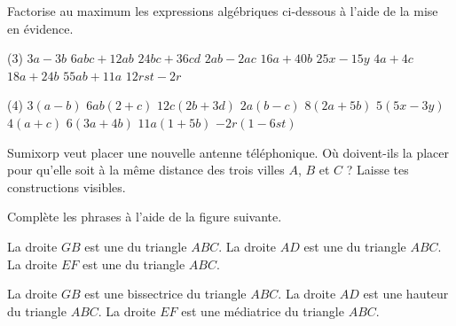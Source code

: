 \documentclass[a4paper,fontsize=12pt, parskip=half]{scrartcl}
\begin{document}
\begin{exercise}
    Factorise au maximum les expressions algébriques ci-dessous à l'aide
    de la mise en évidence.
    \begin{tasks}(3)
        \task $3a-3b$
        \task $6abc+12ab$
        \task $24bc+36cd$
        \task $2ab-2ac$
        \task $16a+40b$
        \task $25x-15y$
        \task $4a+4c$
        \task $18a+24b$
        \task $55ab+11a$
        \task $12rst-2r$
    \end{tasks}
\end{exercise}
\begin{solution}
    \begin{tasks}(4)
        \task $3 (a - b)$
        \task $6ab (2 + c)$
        \task $12c (2 b + 3 d)$
        \task $2a (b - c)$
        \task $8 (2 a + 5 b)$
        \task $5 (5 x - 3 y)$
        \task $4 (a + c)$
        \task $6 (3 a + 4 b)$
        \task $11a ( 1+ 5 b)$
        \task $- 2r (1 - 6 st)$
    \end{tasks}
\end{solution}

\begin{exercise}
    Sumixorp veut placer une nouvelle antenne téléphonique. Où doivent-ils la
    placer pour qu'elle soit à la même distance des trois villes $A$, $B$ et $C$ ?
    Laisse tes constructions visibles.
    \begin{center}
        
    \end{center}
\end{exercise}
\begin{solution}
    
\end{solution}

\begin{exercise}
    Complète les phrases à l'aide de la figure suivante.
    \begin{center}
        
    \end{center}
    \begin{tasks}
        \task La droite $GB$ est une \dotfill du triangle $ABC$.
        \task La droite $AD$ est une \dotfill du triangle $ABC$.
        \task La droite $EF$ est une \dotfill du triangle $ABC$.
    \end{tasks}
\end{exercise}
\begin{solution}
    \begin{tasks}
        \task La droite $GB$ est une bissectrice du triangle $ABC$.
        \task La droite $AD$ est une hauteur du triangle $ABC$.
        \task La droite $EF$ est une médiatrice du triangle $ABC$.
    \end{tasks}
\end{solution}
\end{document}
